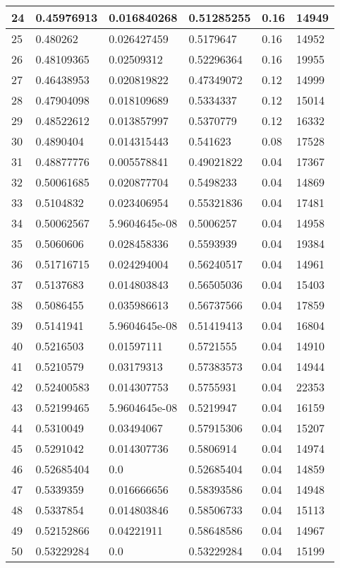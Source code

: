 \begin{longtable}{|l|l|l|l|l|l|}
24 & 0.45976913 & 0.016840268 & 0.51285255 & 0.16 & 14949 \\ \hline 
25 & 0.480262 & 0.026427459 & 0.5179647 & 0.16 & 14952 \\ \hline 
26 & 0.48109365 & 0.02509312 & 0.52296364 & 0.16 & 19955 \\ \hline 
27 & 0.46438953 & 0.020819822 & 0.47349072 & 0.12 & 14999 \\ \hline 
28 & 0.47904098 & 0.018109689 & 0.5334337 & 0.12 & 15014 \\ \hline 
29 & 0.48522612 & 0.013857997 & 0.5370779 & 0.12 & 16332 \\ \hline 
30 & 0.4890404 & 0.014315443 & 0.541623 & 0.08 & 17528 \\ \hline 
31 & 0.48877776 & 0.005578841 & 0.49021822 & 0.04 & 17367 \\ \hline 
32 & 0.50061685 & 0.020877704 & 0.5498233 & 0.04 & 14869 \\ \hline 
33 & 0.5104832 & 0.023406954 & 0.55321836 & 0.04 & 17481 \\ \hline 
34 & 0.50062567 & 5.9604645e-08 & 0.5006257 & 0.04 & 14958 \\ \hline 
35 & 0.5060606 & 0.028458336 & 0.5593939 & 0.04 & 19384 \\ \hline 
36 & 0.51716715 & 0.024294004 & 0.56240517 & 0.04 & 14961 \\ \hline 
37 & 0.5137683 & 0.014803843 & 0.56505036 & 0.04 & 15403 \\ \hline 
38 & 0.5086455 & 0.035986613 & 0.56737566 & 0.04 & 17859 \\ \hline 
39 & 0.5141941 & 5.9604645e-08 & 0.51419413 & 0.04 & 16804 \\ \hline 
40 & 0.5216503 & 0.01597111 & 0.5721555 & 0.04 & 14910 \\ \hline 
41 & 0.5210579 & 0.03179313 & 0.57383573 & 0.04 & 14944 \\ \hline 
42 & 0.52400583 & 0.014307753 & 0.5755931 & 0.04 & 22353 \\ \hline 
43 & 0.52199465 & 5.9604645e-08 & 0.5219947 & 0.04 & 16159 \\ \hline 
44 & 0.5310049 & 0.03494067 & 0.57915306 & 0.04 & 15207 \\ \hline 
45 & 0.5291042 & 0.014307736 & 0.5806914 & 0.04 & 14974 \\ \hline 
46 & 0.52685404 & 0.0 & 0.52685404 & 0.04 & 14859 \\ \hline 
47 & 0.5339359 & 0.016666656 & 0.58393586 & 0.04 & 14948 \\ \hline 
48 & 0.5337854 & 0.014803846 & 0.58506733 & 0.04 & 15113 \\ \hline 
49 & 0.52152866 & 0.04221911 & 0.58648586 & 0.04 & 14967 \\ \hline 
50 & 0.53229284 & 0.0 & 0.53229284 & 0.04 & 15199 \\ \hline 
\end{longtable}
